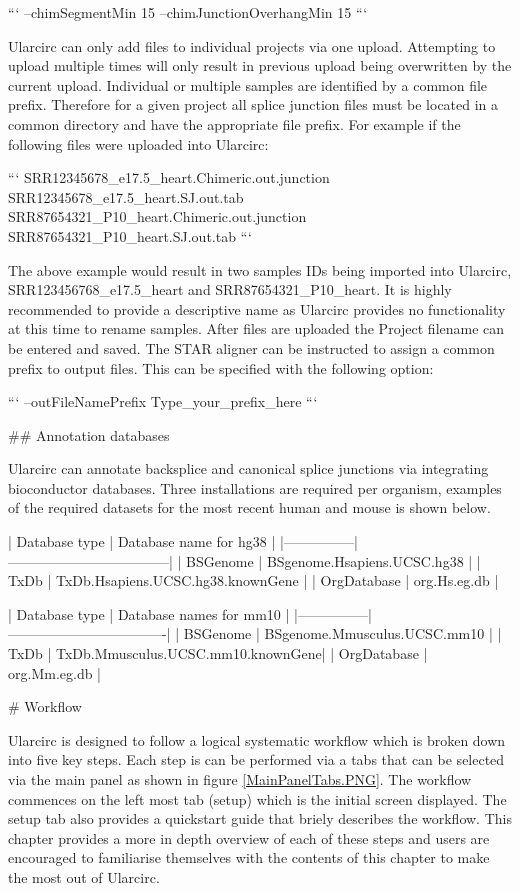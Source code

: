 ```
--chimSegmentMin 15  --chimJunctionOverhangMin 15
```

Ularcirc can only add files to individual projects via one upload. Attempting to upload multiple times will only result in previous upload being overwritten by the current upload. Individual or multiple samples are identified by a common file prefix. Therefore for a given project all splice junction files must be located in a common directory and have the appropriate file prefix. For example if the following files were uploaded into Ularcirc:

```
SRR12345678_e17.5_heart.Chimeric.out.junction
SRR12345678_e17.5_heart.SJ.out.tab
SRR87654321_P10_heart.Chimeric.out.junction
SRR87654321_P10_heart.SJ.out.tab
```


The above example would result in two samples IDs being imported into Ularcirc, SRR123456768_e17.5_heart and SRR87654321_P10_heart. It is highly recommended to provide a descriptive name as Ularcirc provides no functionality at this time to rename samples. After files are uploaded the Project filename can be entered and saved. The STAR aligner can be instructed to assign a common prefix to output files. This can be specified with the following option:

```
--outFileNamePrefix Type_your_prefix_here
```

## Annotation databases

Ularcirc can annotate backsplice and canonical splice junctions via integrating bioconductor databases. Three installations are required per organism, examples of the required datasets for the most recent human and mouse is shown below.



| Database type | Database name for hg38            |
|---------------|-----------------------------------|
| BSGenome      | BSgenome.Hsapiens.UCSC.hg38       |
| TxDb          | TxDb.Hsapiens.UCSC.hg38.knownGene |
| OrgDatabase   | org.Hs.eg.db                      |



| Database type | Database names for mm10           |
|---------------| ----------------------------------|
| BSGenome      | BSgenome.Mmusculus.UCSC.mm10      |
| TxDb          | TxDb.Mmusculus.UCSC.mm10.knownGene|
| OrgDatabase   | org.Mm.eg.db                      |


# Workflow

Ularcirc is designed to follow a logical systematic workflow which is broken down into five key steps. Each step is can be performed  via a tabs that can be selected via the main panel as shown in figure \ref{MainPanelTabs.PNG}. The workflow commences on the left most tab (setup) which is  the initial screen displayed. The setup tab also  provides a quickstart guide that briely describes the workflow. This chapter provides a more in depth overview of each of these steps and users are encouraged to familiarise themselves with the contents of this chapter to make the most out of Ularcirc.


